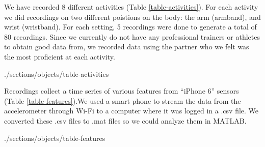 We have recorded 8 different activities (Table \ref{table-activities}). For each activity we did recordings on two different poistions on the body: the arm (armband), and wrist (wristband). For each setting, 5 recordings were done to generate a total of 80 recordings. Since we currently do not have any professional trainers or athletes to obtain good data from, we recorded data using the partner who we felt was the most proficient at each activity. 

 {./sections/objects/table-activities}

Recordings collect a time series of various features from  “iPhone 6” sensors (Table \ref{table-features}).We used a smart phone to stream the data from the accelerometer through Wi-Fi to a computer where it was logged in a .csv file. We converted these .csv files to .mat files so we could analyze them in MATLAB.

 {./sections/objects/table-features}